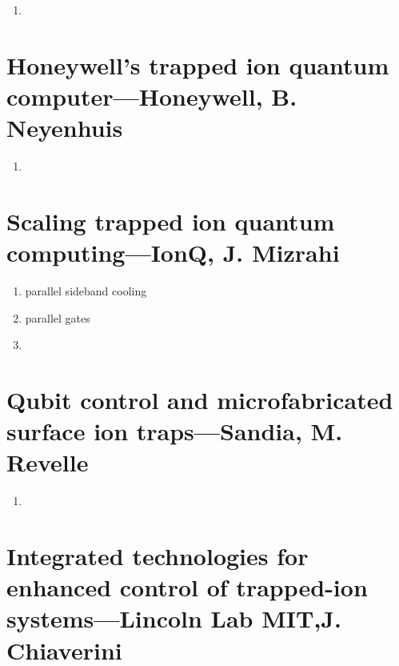 \begin{enumerate}
    \item
\end{enumerate}



\section{Honeywell's trapped ion quantum computer---Honeywell, B. Neyenhuis} %
\label{sec:honeywell_s_trapped_ion_quantum_computer_honeywell_b_neyenhuis}



\begin{enumerate}
    \item
\end{enumerate}



\section{Scaling trapped ion quantum computing---IonQ, J. Mizrahi} %
\label{sec:scaling_trapped_ion_quantum_computing_ionq_j_mizrahi}

\begin{enumerate}
    \item parallel sideband cooling
    \item parallel gates
    \item
\end{enumerate}


\section{Qubit control and microfabricated surface ion traps---Sandia, M. Revelle} %
\label{sec:qubit_control_and_microfabricated_surface_ion_traps_sandia_m_revelle}



\begin{enumerate}
    \item
\end{enumerate}


\section{Integrated technologies for enhanced control of trapped-ion systems---Lincoln Lab MIT,J. Chiaverini} %
\label{sec:integrated_technologies_for_enhanced_control_of_trapped_ion_systems_lincoln_lab_mit_j_chiaverini}



